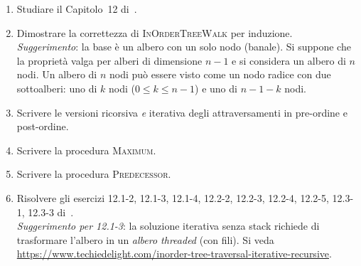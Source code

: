 \begin{enumerate}
	\item Studiare il Capitolo~12 di~\cite{CLRS}.
	
	\item Dimostrare la correttezza di \textsc{InOrderTreeWalk} per induzione.\\
	\textit{Suggerimento}: la base è un albero con un solo nodo (banale).
	Si suppone che la proprietà valga per alberi di dimensione $n-1$ e si
	considera un albero di $n$ nodi.
	Un albero di $n$ nodi può essere visto come un nodo radice con due
	sottoalberi: uno di $k$ nodi ($0 \leq k \leq n-1$) e uno di $n-1-k$ nodi.
	
	\item Scrivere le versioni ricorsiva \emph{e} iterativa degli attraversamenti in
	pre-ordine e post-ordine.
	
	\item Scrivere la procedura \textsc{Maximum}.
	
	\item Scrivere la procedura \textsc{Predecessor}.
	
	\item Risolvere gli esercizi 12.1-2, 12.1-3, 12.1-4, 12.2-2, 12.2-3, 12.2-4,
	12.2-5, 12.3-1, 12.3-3 di~\cite{CLRS}.\\
	\textit{Suggerimento per 12.1-3}: la soluzione iterativa senza stack richiede
	di trasformare l'albero in un \emph{albero threaded} (con fili).
	Si veda \url{https://www.techiedelight.com/inorder-tree-traversal-iterative-recursive}.
\end{enumerate}